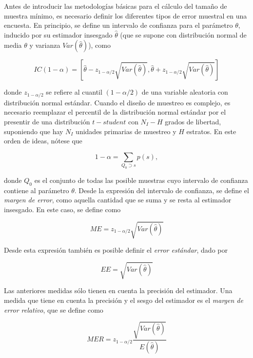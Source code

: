 \documentclass[
  10pt,
  spanish,
]{book}
\begin{document}
Antes de introducir las metodologías básicas para el cálculo del tamaño de muestra mínimo, es necesario definir los diferentes tipos de error muestral en una encuesta. En principio, se define un intervalo de confianza para el parámetro \(\theta\), inducido por su estimador insesgado \(\hat{\theta}\) (que se supone con distribución normal de media \(\theta\) y varianza \(Var(\hat{\theta})\)), como

\begin{equation}\label{ICtheta}
IC(1-\alpha)=\left[\hat{\theta}-z_{1-\alpha / 2}\sqrt{ Var(\hat{\theta})},\hat{\theta}+z_{1-\alpha / 2}\sqrt{Var(\hat{\theta})}\right]
\end{equation}

donde \(z_{1-\alpha / 2}\) se refiere al cuantil \((1-\alpha / 2)\) de una variable aleatoria con distribución normal estándar. Cuando el diseño de muestreo es complejo, es necesario reemplazar el percentil de la distribución normal estándar por el presentir de una distribución \(t-student\) con \(N_I - H\) grados de libertad, suponiendo que hay \(N_I\) unidades primarias de muestreo y \(H\) estratos. En este orden de ideas, nótese que

\begin{equation*}
1-\alpha=\sum_{Q_0 \supset s}p(s),
\end{equation*}

donde \(Q_0\) es el conjunto de todas las posible muestras cuyo intervalo de confianza contiene al parámetro \(\theta\). Desde la expresión del intervalo de confianza, se define el \emph{margen de error}, como aquella cantidad que se suma y se resta al estimador insesgado. En este caso, se define como

\begin{equation}
ME = z_{1-\alpha / 2}\sqrt{ Var(\hat{\theta})}
\end{equation}

Desde esta expresión también es posible definir el \emph{error estándar}, dado por

\begin{equation}
EE = \sqrt{ Var(\hat{\theta})}
\end{equation}

Las anteriores medidas sólo tienen en cuenta la precisión del estimador. Una medida que tiene en cuenta la precisión y el sesgo del estimador es el \emph{margen de error relativo}, que se define como

\begin{equation}
MER = z_{1-\alpha / 2}\frac{\sqrt{ Var(\hat{\theta})}}{E(\hat{\theta})}
\end{equation}
\end{document}
